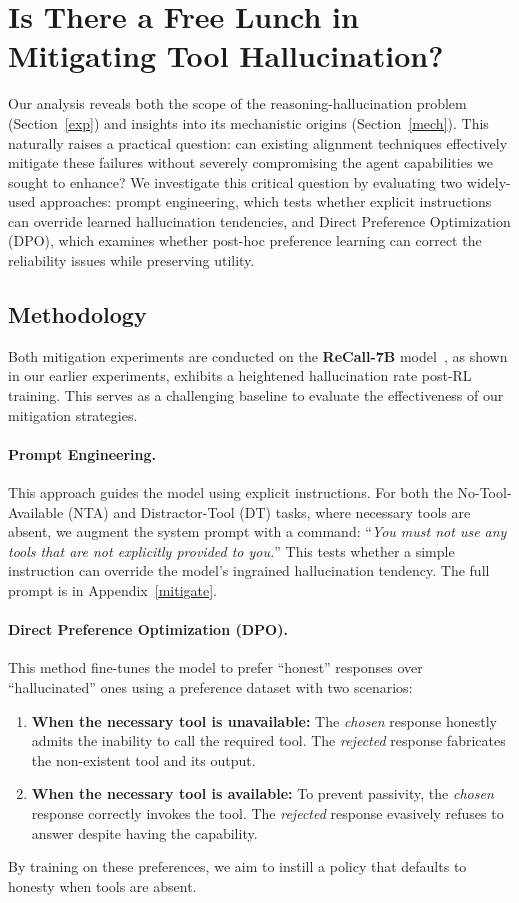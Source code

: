 \documentclass[11pt]{article}
\begin{document}
\section{Is There a Free Lunch in Mitigating Tool Hallucination?}
\label{sec:lesson}

Our analysis reveals both the scope of the reasoning-hallucination problem (Section~\ref{exp}) and insights into its mechanistic origins (Section~\ref{mech}). This naturally raises a practical question: can existing alignment techniques effectively mitigate these failures without severely compromising the agent capabilities we sought to enhance? We investigate this critical question by evaluating two widely-used approaches: prompt engineering, which tests whether explicit instructions can override learned hallucination tendencies, and Direct Preference Optimization (DPO), which examines whether post-hoc preference learning can correct the reliability issues while preserving utility.

\subsection{Methodology}

Both mitigation experiments are conducted on the \textbf{ReCall-7B} model~\cite{chen2025learning}, as shown in our earlier experiments, exhibits a heightened hallucination rate post-RL training. This serves as a challenging baseline to evaluate the effectiveness of our mitigation strategies.

\paragraph{Prompt Engineering.} This approach guides the model using explicit instructions. For both the No-Tool-Available (NTA) and Distractor-Tool (DT) tasks, where necessary tools are absent, we augment the system prompt with a command: ``\textit{You must not use any tools that are not explicitly provided to you.}'' This tests whether a simple instruction can override the model's ingrained hallucination tendency. The full prompt is in Appendix~\ref{mitigate}.

\paragraph{Direct Preference Optimization (DPO).} This method fine-tunes the model to prefer ``honest'' responses over ``hallucinated'' ones using a preference dataset with two scenarios:
\begin{enumerate}
\item \textbf{When the necessary tool is unavailable:} The \textit{chosen} response honestly admits the inability to call the required tool. The \textit{rejected} response fabricates the non-existent tool and its output.
\item \textbf{When the necessary tool is available:} To prevent passivity, the \textit{chosen} response correctly invokes the tool. The \textit{rejected} response evasively refuses to answer despite having the capability.
\end{enumerate}
By training on these preferences, we aim to instill a policy that defaults to honesty when tools are absent.
\end{document}
